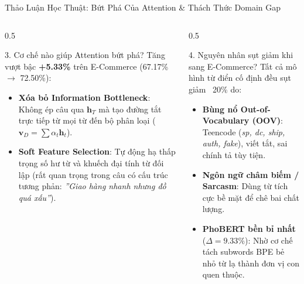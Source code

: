 \documentclass[aspectratio=169, 10pt]{beamer}
\begin{document}
\begin{frame}{Thảo Luận Học Thuật: Bứt Phá Của Attention \& Thách Thức Domain Gap}
  \begin{columns}[t]
    \begin{column}{0.5\textwidth}
      \begin{block}{3. Cơ chế nào giúp Attention bứt phá?}
        \fontsize{7.5}{9.5}\selectfont
        Tăng vượt bậc \textbf{+5.33\%} trên E-Commerce (67.17\% $\to$ 72.50\%):
        \begin{itemize}
          \item \textbf{Xóa bỏ Information Bottleneck}: Không ép câu qua $\mathbf{h}_T$ mà tạo đường tắt trực tiếp từ mọi từ đến bộ phân loại ($\mathbf{v}_D = \sum \alpha_t \mathbf{h}_t$).
          \item \textbf{Soft Feature Selection}: Tự động hạ thấp trọng số hư từ và khuếch đại tính từ đối lập (rất quan trọng trong câu có cấu trúc tương phản: \textit{''Giao hàng nhanh nhưng đồ quá xấu''}).
        \end{itemize}
      \end{block}
    \end{column}

    \begin{column}{0.5\textwidth}
      \begin{alertblock}{4. Nguyên nhân sụt giảm khi sang E-Commerce?}
        \fontsize{7.5}{9.5}\selectfont
        Tất cả mô hình từ điển cố định đều sụt giảm ~20\% do:
        \begin{itemize}
          \item \textbf{Bùng nổ Out-of-Vocabulary (OOV)}: Teencode (\textit{sp, dc, ship, auth, fake}), viết tắt, sai chính tả tùy tiện.
          \item \textbf{Ngôn ngữ châm biếm / Sarcasm}: Dùng từ tích cực bề mặt để chê bai chất lượng.
          \item \textbf{PhoBERT bền bỉ nhất} ($\Delta = 9.33\%$): Nhờ cơ chế tách subwords BPE bẻ nhỏ từ lạ thành đơn vị con quen thuộc.
        \end{itemize}
      \end{alertblock}
    \end{column}
  \end{columns}
\end{frame}
\end{document}
